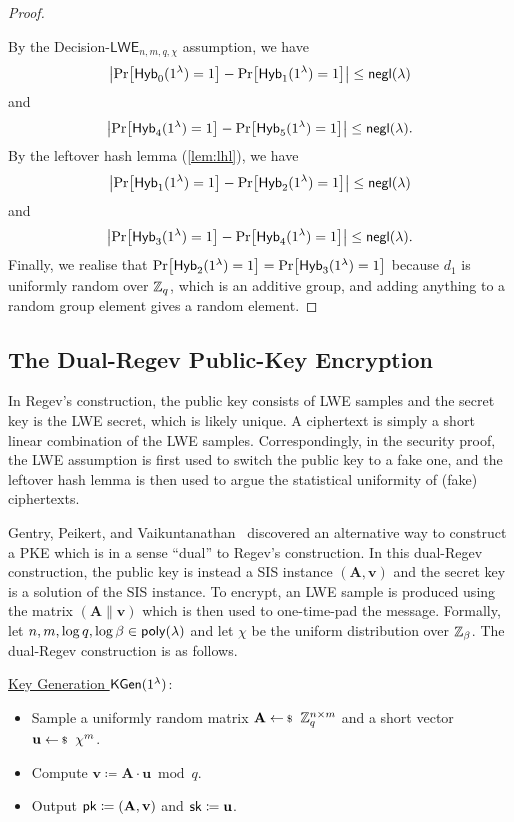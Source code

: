 \documentclass[10pt,twoside]{article}
\renewcommand{\vec}[1]{\mathbf{#1}}
\newcommand{\mat}[1]{\mathbf{#1}}
\newcommand{\LWE}{\mathsf{LWE}}
\newcommand{\Hyb}{\mathsf{Hyb}}
\begin{document}
\begin{proof}
\begin{pcvstack}
\begin{pchstack}
        \end{pchstack}

    \end{pcvstack}
    By the Decision-$\LWE_{n,m,q,\chi}$ assumption, we have
    \[\abs{\prob{\Hyb_0(\secparam) = 1} - \prob{\Hyb_1(\secparam) = 1}} \leq \negl\]
    and
    \[\abs{\prob{\Hyb_4(\secparam) = 1} - \prob{\Hyb_5(\secparam) = 1}} \leq \negl.\]
    By the leftover hash lemma (\cref{lem:lhl}), we have
    \[\abs{\prob{\Hyb_1(\secparam) = 1} - \prob{\Hyb_2(\secparam) = 1}} \leq \negl\]
    and
    \[\abs{\prob{\Hyb_3(\secparam) = 1} - \prob{\Hyb_4(\secparam) = 1}} \leq \negl.\]
    Finally, we realise that $\prob{\Hyb_2(\secparam) = 1} = \prob{\Hyb_3(\secparam) = 1}$ because $d_1$ is uniformly random over $\mathbb{Z}_q$, which is an additive group, and adding anything to a random group element gives a random element.
\end{proof}

\subsection{The Dual-Regev Public-Key Encryption}

In Regev's construction, the public key consists of LWE samples and the secret key is the LWE secret, which is likely unique.
A ciphertext is simply a short linear combination of the LWE samples.
Correspondingly, in the security proof, the LWE assumption is first used to switch the public key to a fake one, and the leftover hash lemma is then used to argue the statistical uniformity of (fake) ciphertexts.

Gentry, Peikert, and Vaikuntanathan~\cite{STOC:GenPeiVai08} discovered an alternative way to construct a PKE which is in a sense ``dual'' to Regev's construction.
In this dual-Regev construction, the public key is instead a SIS instance $(\mat{A}, \vec{v})$ and the secret key is a solution of the SIS instance.
To encrypt, an LWE sample is produced using the matrix $(\mat{A} \| \vec{v})$ which is then used to one-time-pad the message.
Formally, let $n,m,\log q, \log \beta \in \poly$ and let $\chi$ be the uniform distribution over $\mathbb{Z}_\beta$.  The dual-Regev construction is as follows.

\noindent\underline{Key Generation $\mathsf{KGen}(1^{\lambda})$}:
\begin{itemize}
    \item Sample a uniformly random matrix $\mat{A} \sample \ZZ_q^{n \times m}$ and a short vector $\vec{u} \sample \chi^{m}$.
    \item Compute $\vec{v} \coloneqq \mat{A} \cdot \vec{u} \bmod q$.
    \item Output $\pk \coloneqq (\mat{A}, \vec{v})$ and $\sk \coloneqq \vec{u}$.
\end{itemize}
\end{document}

